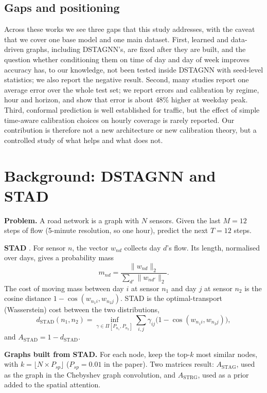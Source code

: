 \documentclass[conference]{IEEEtran}
\begin{document}
\subsection{Gaps and positioning}\label{sec:ls-e}
Across these works we see three gaps that this study addresses, with the caveat that we cover one base model and one main dataset. First, learned and data-driven graphs, including DSTAGNN's, are fixed after they are built, and the question whether conditioning them on time of day and day of week improves accuracy has, to our knowledge, not been tested inside DSTAGNN with seed-level statistics; we also report the negative result. Second, many studies report one average error over the whole test set; we report errors and calibration by regime, hour and horizon, and show that error is about 48\% higher at weekday peak. Third, conformal prediction is well established for traffic, but the effect of simple time-aware calibration choices on hourly coverage is rarely reported. Our contribution is therefore not a new architecture or new calibration theory, but a controlled study of what helps and what does not.

\section{Background: DSTAGNN and STAD}
\textbf{Problem.} A road network is a graph with $N$ sensors. Given the last $M=12$ steps of flow (5-minute resolution, so one hour), predict the next $T=12$ steps.

\textbf{STAD} \cite[Eqs.~3--5]{lan2022dstagnn}. For sensor $n$, the vector $w_{nd}$ collects day $d$'s flow. Its length, normalised over days, gives a probability mass
\begin{equation}
m_{nd}=\frac{\lVert w_{nd}\rVert_2}{\sum_{d'}\lVert w_{nd'}\rVert_2}.
\end{equation}
The cost of moving mass between day $i$ at sensor $n_1$ and day $j$ at sensor $n_2$ is the cosine distance $1-\cos(w_{n_1 i},w_{n_2 j})$. STAD is the optimal-transport (Wasserstein) cost between the two distributions,
\begin{equation}
d_{\mathrm{STAD}}(n_1,n_2)=\inf_{\gamma\in\Pi[P_{n_1},P_{n_2}]}\sum_{i,j}\gamma_{ij}\bigl(1-\cos(w_{n_1 i},w_{n_2 j})\bigr),
\end{equation}
and $A_{\mathrm{STAD}}=1-d_{\mathrm{STAD}}$.

\textbf{Graphs built from STAD.} For each node, keep the top-$k$ most similar nodes, with $k=\lfloor N\times P_{sp}\rfloor$ ($P_{sp}=0.01$ in the paper). Two matrices result: $A_{\mathrm{STAG}}$, used as the graph in the Chebyshev graph convolution, and $A_{\mathrm{STRG}}$, used as a prior added to the spatial attention.
\end{document}
